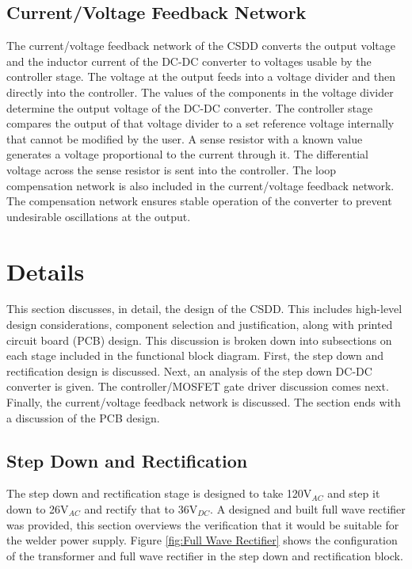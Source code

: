 \documentclass[11pt]{article}
\begin{document}
    \subsection{Current/Voltage Feedback Network}
        The current/voltage feedback network of the CSDD converts the output voltage and the inductor current of the DC-DC converter to voltages usable by the controller stage. The voltage at the output feeds into a voltage divider and then directly into the controller. The values of the components in the voltage divider determine the output voltage of the DC-DC converter. The controller stage compares the output of that voltage divider to a set reference voltage internally that cannot be modified by the user. A sense resistor with a known value generates a voltage proportional to the current through it. The differential voltage across the sense resistor is sent into the controller. The loop compensation network is also included in the current/voltage feedback network. The compensation network ensures stable operation of the converter to prevent undesirable oscillations at the output.
        
\section{Details}

\noindent This section discusses, in detail, the design of the CSDD. This includes high-level design considerations, component selection and justification, along with printed circuit board (PCB) design. This discussion is broken down into subsections on each stage included in the functional block diagram. First, the step down and rectification design is discussed. Next, an analysis of the step down DC-DC converter is given. The controller/MOSFET gate driver discussion comes next. Finally, the current/voltage feedback network is discussed. The section ends with a discussion of the PCB design. 

    \subsection{Step Down and Rectification}
        The step down and rectification stage is designed to take 120V$_{AC}$ and step it down to 26V$_{AC}$ and rectify that to 36V$_{DC}$. A designed and built full wave rectifier was provided, this section overviews the verification that it would be suitable for the welder power supply. Figure \ref{fig:Full Wave Rectifier} shows the configuration of the transformer and full wave rectifier in the step down and rectification block. 
        
\end{document}

